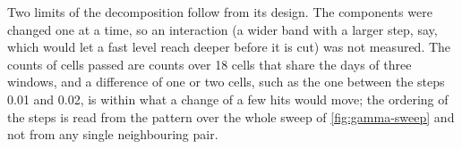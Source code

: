 Two limits of the decomposition follow from its design. The components were changed one at a time, so an interaction (a wider band with a larger step, say, which would let a fast level reach deeper before it is cut) was not measured. The counts of cells passed are counts over 18 cells that share the days of three windows, and a difference of one or two cells, such as the one between the steps 0.01 and 0.02, is within what a change of a few hits would move; the ordering of the steps is read from the pattern over the whole sweep of \cref{fig:gamma-sweep} and not from any single neighbouring pair.
